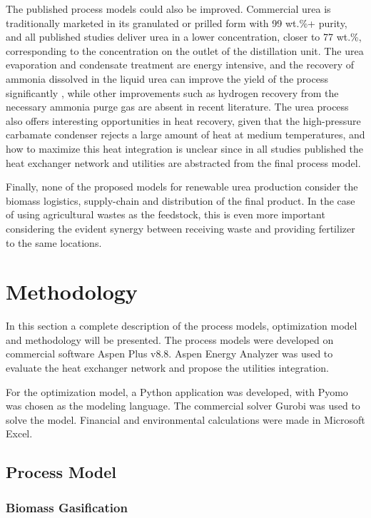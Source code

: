 \documentclass[a4paper, titlepage]{article}
\begin{document}
The published process models could also be improved. Commercial urea is traditionally marketed in its granulated or prilled
form with 99 wt.\%+ purity, and all published studies deliver urea in a lower concentration, closer to 77 wt.\%,
corresponding to the concentration on the outlet of the distillation unit. The urea evaporation and condensate
treatment are energy intensive, and the recovery of ammonia dissolved in the liquid urea can improve the yield of the
process significantly \cite{meessenUreaSynthesis2014}, while other improvements such as hydrogen recovery from the
necessary ammonia purge gas are absent in recent literature. The urea process also offers interesting opportunities
in heat recovery, given that the high-pressure carbamate condenser rejects a large amount of heat at medium
temperatures, and how to maximize this heat integration is unclear since in all studies published the heat exchanger
network and utilities are abstracted from the final process model.

Finally, none of the proposed models for renewable urea production consider the biomass logistics, supply-chain and
distribution of the final product. In the case of using agricultural wastes as the feedstock, this is even more
important considering the evident synergy between receiving waste and providing fertilizer to the same locations.

\section{Methodology}

In this section a complete description of the process models, optimization model and methodology will be presented.
The process models were developed on commercial software Aspen Plus v8.8. Aspen Energy Analyzer was used to evaluate
the heat exchanger network and propose the utilities integration.

For the optimization model, a Python application was developed, with Pyomo was chosen as the modeling language. The
commercial solver Gurobi was used to solve the model. Financial and environmental calculations were made in
Microsoft Excel.

\subsection{Process Model}

\subsubsection{Biomass Gasification}
\end{document}
